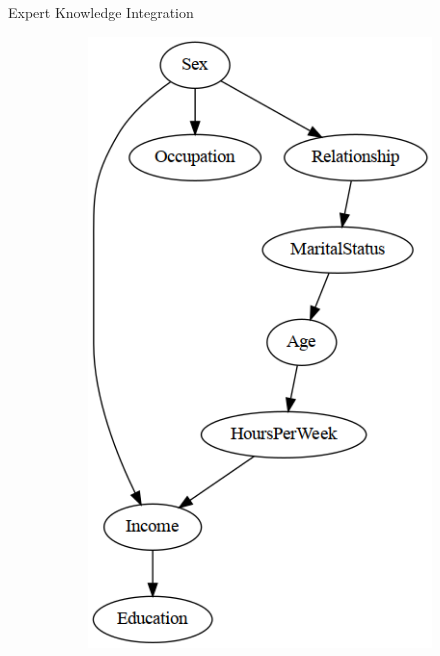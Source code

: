 \documentclass{beamer}
\begin{document}
\begin{frame}{Expert Knowledge Integration}
\begin{figure}
\begin{subfigure}{0.45 \textwidth}
			\includegraphics[scale=0.28]{imgs/adult_bic_start.png}
		\end{subfigure}
	\end{figure}
\end{frame}
\end{document}
